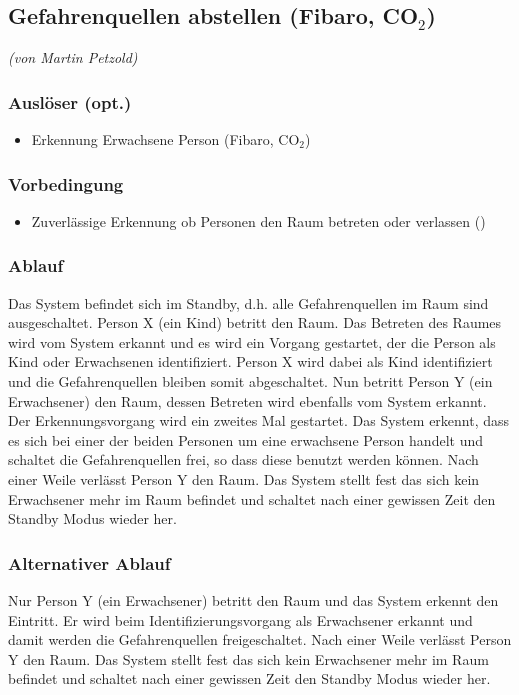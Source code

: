 \subsection{Gefahrenquellen abstellen (Fibaro, CO$_2$)}
\label{subsec:szenarioGefahrenquellen}
\emph{(von Martin Petzold)}
\subsubsection{Auslöser (opt.)}
\begin{itemize}
	\item Erkennung Erwachsene Person (Fibaro, CO$_2$)
\end{itemize}

\subsubsection{Vorbedingung}
\begin{itemize}
	\item Zuverlässige Erkennung ob Personen den Raum betreten oder verlassen ()
\end{itemize}

\subsubsection{Ablauf}
Das System befindet sich im Standby, d.h. alle Gefahrenquellen im Raum sind ausgeschaltet. Person X (ein Kind) betritt den Raum. Das Betreten des Raumes wird vom System erkannt und es wird ein Vorgang gestartet, der die Person als Kind oder Erwachsenen identifiziert. Person X wird dabei als Kind identifiziert und die Gefahrenquellen bleiben somit abgeschaltet. 
Nun betritt Person Y (ein Erwachsener) den Raum, dessen Betreten wird ebenfalls vom System erkannt. Der Erkennungsvorgang wird ein zweites Mal gestartet. Das System erkennt, dass es sich bei einer der beiden Personen um eine erwachsene Person handelt und schaltet die Gefahrenquellen frei, so dass diese benutzt werden können.
Nach einer Weile verlässt Person Y den Raum. Das System stellt fest das sich kein Erwachsener mehr im Raum befindet und schaltet nach einer gewissen Zeit den Standby Modus wieder her.

\subsubsection{Alternativer Ablauf}
Nur Person Y (ein Erwachsener) betritt den Raum und das System erkennt den Eintritt. Er wird beim Identifizierungsvorgang als Erwachsener erkannt und damit werden die Gefahrenquellen freigeschaltet.
Nach einer Weile verlässt Person Y den Raum. Das System stellt fest das sich kein Erwachsener mehr im Raum befindet und schaltet nach einer gewissen Zeit den Standby Modus wieder her.

